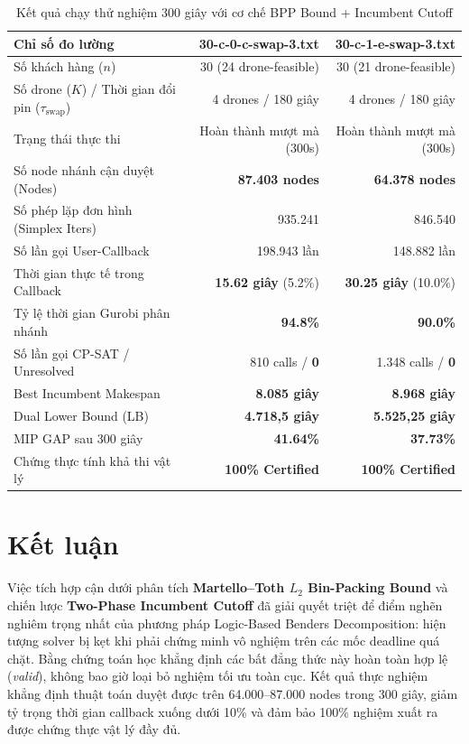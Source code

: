 \documentclass[12pt,a4paper]{article}
\newcommand{\swap}{\tau_{\mathrm{swap}}}
\begin{document}
\begin{table}[H]
\centering
\caption{Kết quả chạy thử nghiệm 300 giây với cơ chế BPP Bound + Incumbent Cutoff}
\label{tab:benchmark-results}
\begin{tabular}{lrr}
\toprule
\textbf{Chỉ số đo lường} & \textbf{30-c-0-c-swap-3.txt} & \textbf{30-c-1-e-swap-3.txt} \\
\midrule
Số khách hàng ($n$) & 30 (24 drone-feasible) & 30 (21 drone-feasible) \\
Số drone ($K$) / Thời gian đổi pin ($\swap$) & 4 drones / 180 giây & 4 drones / 180 giây \\
Trạng thái thực thi & Hoàn thành mượt mà (300s) & Hoàn thành mượt mà (300s) \\
Số node nhánh cận duyệt (Nodes) & \textbf{87.403 nodes} & \textbf{64.378 nodes} \\
Số phép lặp đơn hình (Simplex Iters) & 935.241 & 846.540 \\
Số lần gọi User-Callback & 198.943 lần & 148.882 lần \\
Thời gian thực tế trong Callback & \textbf{15.62 giây} (5.2\%) & \textbf{30.25 giây} (10.0\%) \\
Tỷ lệ thời gian Gurobi phân nhánh & \textbf{94.8\%} & \textbf{90.0\%} \\
Số lần gọi CP-SAT / Unresolved & 810 calls / \textbf{0} & 1.348 calls / \textbf{0} \\
Best Incumbent Makespan & \textbf{8.085 giây} & \textbf{8.968 giây} \\
Dual Lower Bound (LB) & \textbf{4.718,5 giây} & \textbf{5.525,25 giây} \\
MIP GAP sau 300 giây & \textbf{41.64\%} & \textbf{37.73\%} \\
Chứng thực tính khả thi vật lý & \textbf{100\% Certified} & \textbf{100\% Certified} \\
\bottomrule
\end{tabular}
\end{table}

\section{Kết luận}
\label{sec:conclusion}

Việc tích hợp cận dưới phân tích \textbf{Martello--Toth $L_2$ Bin-Packing Bound} và chiến lược \textbf{Two-Phase Incumbent Cutoff} đã giải quyết triệt để điểm nghẽn nghiêm trọng nhất của phương pháp Logic-Based Benders Decomposition: hiện tượng solver bị kẹt khi phải chứng minh vô nghiệm trên các mốc deadline quá chặt. Bằng chứng toán học khẳng định các bất đẳng thức này hoàn toàn hợp lệ (\emph{valid}), không bao giờ loại bỏ nghiệm tối ưu toàn cục. Kết quả thực nghiệm khẳng định thuật toán duyệt được trên 64.000--87.000 nodes trong 300 giây, giảm tỷ trọng thời gian callback xuống dưới 10\% và đảm bảo 100\% nghiệm xuất ra được chứng thực vật lý đầy đủ.
\end{document}
